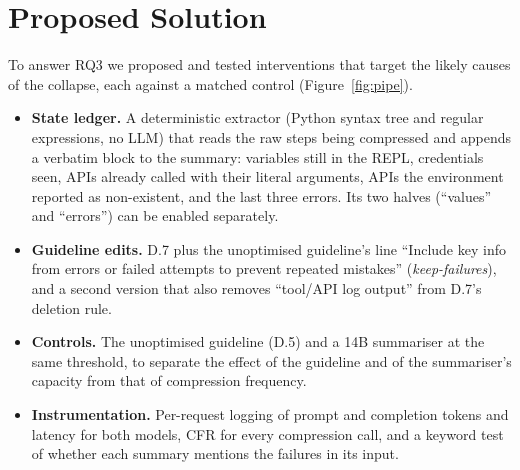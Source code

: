 \documentclass[10pt,a4paper]{article}
\begin{document}
\section{Proposed Solution}

To answer RQ3 we proposed and tested interventions that target the likely
causes of the collapse, each against a matched control
(Figure~\ref{fig:pipe}).

\begin{itemize}
\item \textbf{State ledger.} A deterministic extractor (Python syntax tree and
regular expressions, no LLM) that reads the raw steps being compressed and
appends a verbatim block to the summary: variables still in the REPL,
credentials seen, APIs already called with their literal arguments, APIs the
environment reported as non-existent, and the last three errors. Its two halves
(``values'' and ``errors'') can be enabled separately.
\item \textbf{Guideline edits.} D.7 plus the unoptimised guideline's line
``Include key info from errors or failed attempts to prevent repeated
mistakes'' (\emph{keep-failures}), and a second version that also removes
``tool/API log output'' from D.7's deletion rule.
\item \textbf{Controls.} The unoptimised guideline (D.5) and a 14B summariser
at the same threshold, to separate the effect of the guideline and of the
summariser's capacity from that of compression frequency.
\item \textbf{Instrumentation.} Per-request logging of prompt and completion
tokens and latency for both models, CFR for every compression call, and a
keyword test of whether each summary mentions the failures in its input.
\end{itemize}
\end{document}
